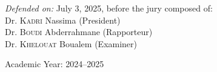 {\begin{titlepage}

    \vspace{2mm}





\begin{minipage}{0.8\linewidth}
  \begin{flushleft}
    \large
    \emph{Defended on:} July 3, 2025, before the jury composed of: \\[0.2cm]
    Dr. \textsc{Kadri} Nassima \hfill (President)\\
    Dr. \textsc{Boudi} Abderrahmane \hfill (Rapporteur)\\
    Dr. \textsc{Khelouat} Boualem \hfill (Examiner)\\
  \end{flushleft}
\end{minipage}





\vspace{7mm}



    {\large Academic Year: 2024–2025}
  \end{titlepage}
  \restoregeometry
}
